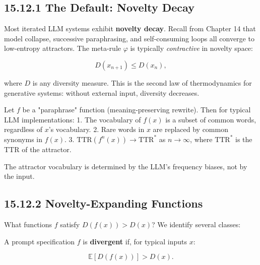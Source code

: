 \subsection{15.12.1 The Default: Novelty Decay}

Most iterated LLM systems exhibit \textbf{novelty decay}. Recall from Chapter 14 that model collapse, successive paraphrasing, and self-consuming loops all converge to low-entropy attractors. The meta-rule $\varphi$ is typically \textit{contractive} in novelty space:

\[D(x_{n+1}) \leq D(x_n),\]

where $D$ is any diversity measure. This is the second law of thermodynamics for generative systems: without external input, diversity decreases.

\begin{proposition}
Let $f$ be a "paraphrase" function (meaning-preserving rewrite). Then for typical LLM implementations:
1. The vocabulary of $f(x)$ is a subset of common words, regardless of $x$'s vocabulary.
2. Rare words in $x$ are replaced by common synonyms in $f(x)$.
3. $\mathrm{TTR}(f^n(x)) \to \mathrm{TTR}^*$ as $n \to \infty$, where $\mathrm{TTR}^*$ is the TTR of the attractor.

The attractor vocabulary is determined by the LLM's frequency biases, not by the input.
\end{proposition}

\subsection{15.12.2 Novelty-Expanding Functions}

What functions $f$ satisfy $D(f(x)) > D(x)$? We identify several classes:

\begin{definition}
A prompt specification $f$ is \textbf{divergent} if, for typical inputs $x$:

\[\mathbb{E}[D(f(x))] > D(x).\]
\end{definition}

